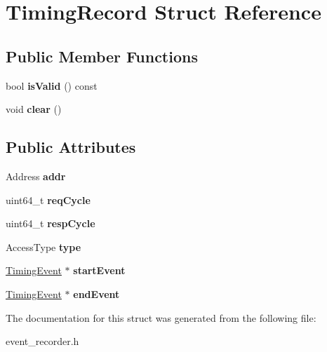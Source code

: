 \hypertarget{structTimingRecord}{\section{Timing\-Record Struct Reference}
\label{structTimingRecord}
}
\subsection*{Public Member Functions}
\begin{DoxyCompactItemize}
\item 
\hypertarget{structTimingRecord_a9db9cbe88ebc04474ddb73e38e09b3a5}{bool {\bfseries is\-Valid} () const }\label{structTimingRecord_a9db9cbe88ebc04474ddb73e38e09b3a5}

\item 
\hypertarget{structTimingRecord_ab2ace629b65745ca1d4e290ae3250306}{void {\bfseries clear} ()}\label{structTimingRecord_ab2ace629b65745ca1d4e290ae3250306}

\end{DoxyCompactItemize}
\subsection*{Public Attributes}
\begin{DoxyCompactItemize}
\item 
\hypertarget{structTimingRecord_aa06a3efbbb07642ab0398ba5a1680571}{Address {\bfseries addr}}\label{structTimingRecord_aa06a3efbbb07642ab0398ba5a1680571}

\item 
\hypertarget{structTimingRecord_abbce0ebeaa53e58ae4d2a29baa3e3d3a}{uint64\-\_\-t {\bfseries req\-Cycle}}\label{structTimingRecord_abbce0ebeaa53e58ae4d2a29baa3e3d3a}

\item 
\hypertarget{structTimingRecord_a1e5ddb675156fdc4e0ab4b5790727893}{uint64\-\_\-t {\bfseries resp\-Cycle}}\label{structTimingRecord_a1e5ddb675156fdc4e0ab4b5790727893}

\item 
\hypertarget{structTimingRecord_a5ad9028ae5f2dc46c4da25df0e116c6d}{Access\-Type {\bfseries type}}\label{structTimingRecord_a5ad9028ae5f2dc46c4da25df0e116c6d}

\item 
\hypertarget{structTimingRecord_a5b3fc1b2cd54e32b0de689a798b1ac9e}{\hyperlink{classTimingEvent}{Timing\-Event} $\ast$ {\bfseries start\-Event}}\label{structTimingRecord_a5b3fc1b2cd54e32b0de689a798b1ac9e}

\item 
\hypertarget{structTimingRecord_a375c3f139d33397b4fc95fa1ab6c0af5}{\hyperlink{classTimingEvent}{Timing\-Event} $\ast$ {\bfseries end\-Event}}\label{structTimingRecord_a375c3f139d33397b4fc95fa1ab6c0af5}

\end{DoxyCompactItemize}


The documentation for this struct was generated from the following file\-:\begin{DoxyCompactItemize}
\item 
event\-\_\-recorder.\-h\end{DoxyCompactItemize}
